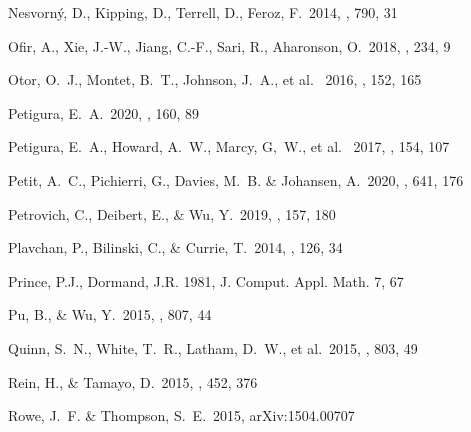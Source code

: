 \documentclass{aastex62}
\begin{document}
\begin{thebibliography}{}
 Nesvorn{\'y}, D., Kipping, D., Terrell, D., Feroz, F.~2014, \apj, 790, 31


 Ofir, A., Xie, J.-W., Jiang, C.-F., Sari, R., Aharonson, O.~2018, \apjs, 234, 9

 Otor, O.~J.,  Montet, B.~T.,  Johnson, J.~A., et al. ~2016, \aj, 152, 165



 Petigura, E.~A.~2020, \aj, 160, 89

 Petigura, E.~A., Howard, A.~W., Marcy, G,~W., et al. ~2017, \aj, 154, 107

 Petit, A.~C., Pichierri, G., Davies, M.~B. \& Johansen, A.~2020, \aap, 641, 176

 Petrovich, C., Deibert, E., \& Wu, Y.~2019, \aj, 157, 180
       
 Plavchan, P., Bilinski, C., \& Currie, T.\ 2014, \pasp, 126, 34 %

 Prince, P.J., Dormand, J.R. 1981, J. Comput. Appl. Math. 7, 67

{Pu}, B., \& {Wu}, Y.~2015, \apj, 807, 44


Quinn, S.~N., White, T.~R., Latham, D.~W., et al.~2015, \apj, 803, 49


 Rein, H., \& Tamayo, D.~2015, \mnras, 452, 376

 Rowe, J.~F. \& Thompson, S.~E.~2015, arXiv:1504.00707


\end{thebibliography}
\end{document}
